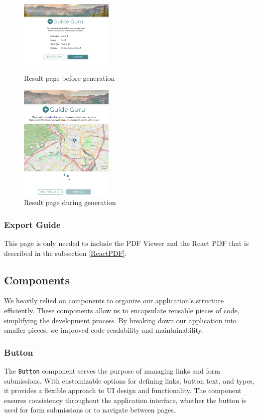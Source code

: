 \documentclass[english,notitlepage,smartquotes]{hgbreport}
\begin{document}
\begin{figure}[H]
	\centering
	\includegraphics[width=0.4\textwidth]{ResultPage.png}
	\caption{Result page before generation}
	\includegraphics[width=0.4\textwidth]{ResultPageLoading.png}
	\caption{Result page during generation}
\end{figure}

\subsubsection{Export Guide}

This page is only needed to include the PDF Viewer and the React PDF that is described in the subsection \ref{ReactPDF}. 

\subsection{Components}
We heavily relied on components to organize our application's structure efficiently. These components allow us to encapsulate reusable pieces of code, simplifying the development process. By breaking down our application into smaller pieces, we improved code readability and maintainability.

\subsubsection{Button}
The \texttt{Button} component serves the purpose of managing links and form submissions. With customizable options for defining links, button text, and types, it provides a flexible approach to UI design and functionality. The component ensures consistency throughout the application interface, whether the button is used for form submissions or to navigate between pages.
\end{document}
